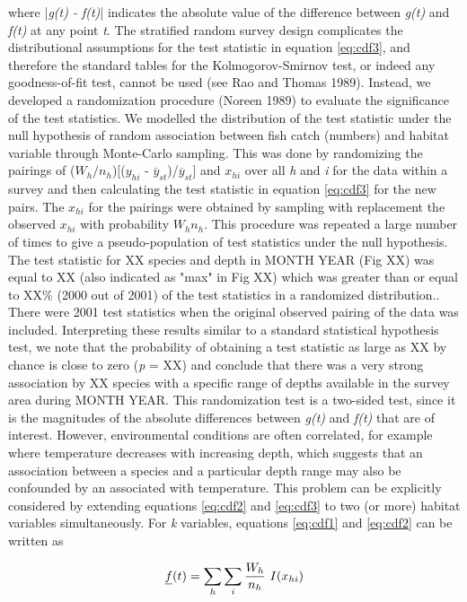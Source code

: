 \documentclass[11pt]{book}\usepackage[]{graphicx}\usepackage[]{color}
\begin{document}
where |\emph{g(t) - f(t)}| indicates the absolute value of the difference between \emph{g(t)} and \emph{f(t)} at any point \emph{t}.
The stratified random survey design complicates the distributional assumptions for the test statistic in equation \ref{eq:cdf3}, and therefore the standard tables for the Kolmogorov-Smirnov test, or indeed any goodness-of-fit test, cannot be used (see Rao and Thomas 1989). Instead, we developed a randomization procedure (Noreen 1989) to evaluate the significance of the test statistics. We modelled the distribution of the test statistic under the null hypothesis of random association between fish catch (numbers) and habitat variable through Monte-Carlo sampling. This was done by randomizing the pairings of ($W_h/n_h$)[($y_{hi}$ - $\overline{y}_{st}$)/$\overline{y}_{st}$] and $x_{hi}$ over all \emph{h} and \emph{i} for the data within a survey and then calculating the test statistic in equation \ref{eq:cdf3} for the new pairs. The $x_{hi}$ for the pairings were obtained by sampling with replacement the observed $x_{hi}$ with probability $W_h$$n_h$. This procedure was repeated a large number of times to give a pseudo-population of test statistics under the null hypothesis. The test statistic for XX species and depth in MONTH YEAR (Fig XX) was equal to XX (also indicated as "max" in Fig XX) which was greater than or equal to XX\% (2000 out of 2001) of the test statistics in a randomized distribution.. There were 2001 test statistics when the original observed pairing of the data was included. Interpreting these results similar to a standard statistical hypothesis test, we note that the probability of obtaining a test statistic as large as XX by chance is close to zero (\emph{p} = XX) and conclude that there was a very strong association by XX species with a specific range of depths available in the survey area during MONTH YEAR. This randomization test is a two-sided test, since it is the magnitudes of the absolute differences between \emph{g(t)} and \emph{f(t)} that are of interest.
However, environmental conditions are often correlated, for example where temperature decreases with increasing depth, which suggests that an association between a species and a particular depth range may also be confounded by an associated with temperature. This problem can be explicitly considered by extending equations \ref{eq:cdf2} and \ref{eq:cdf3} to two (or more) habitat variables simultaneously. For \emph{k} variables, equations \ref{eq:cdf1} and \ref{eq:cdf2} can be written as

\begin{equation}
\label{eq:cdf4}
\emph{f}(t) = \sum_{h}\sum_{i}\frac{W_h}{n_h}~I({x_{hi}}) %
\end{equation}
\end{document}
